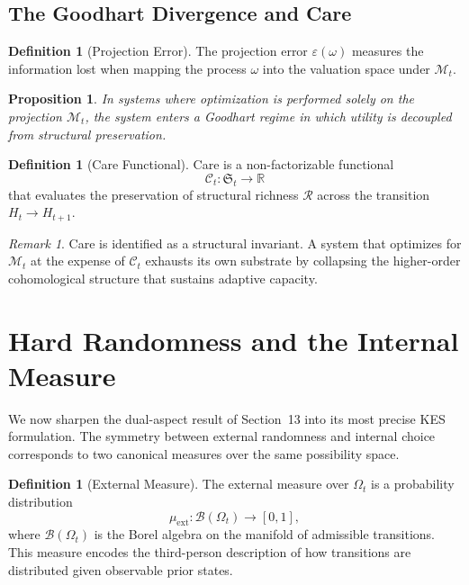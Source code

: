 \documentclass[11pt,a4paper]{article}
\newtheorem{proposition}[theorem]{Proposition}
\theoremstyle{definition}
\newtheorem{definition}[theorem]{Definition}
\theoremstyle{remark}
\newtheorem{remark}[theorem]{Remark}
\begin{document}
\subsection{The Goodhart Divergence and Care}

\begin{definition}[Projection Error]
The projection error $\varepsilon(\omega)$ measures the information lost when mapping the process $\omega$ into the valuation space under $\mathcal{M}_t$.
\end{definition}

\begin{proposition}
In systems where optimization is performed solely on the projection $\mathcal{M}_t$, the system enters a Goodhart regime in which utility is decoupled from structural preservation.
\end{proposition}

\begin{definition}[Care Functional]
Care is a non-factorizable functional
\[
\mathcal{C}_t : \mathfrak{S}_t \to \mathbb{R}
\]
that evaluates the preservation of structural richness $\mathcal{R}$ across the transition $H_t \to H_{t+1}$.
\end{definition}

\begin{remark}
Care is identified as a structural invariant. A system that optimizes for $\mathcal{M}_t$ at the expense of $\mathcal{C}_t$ exhausts its own substrate by collapsing the higher-order cohomological structure that sustains adaptive capacity.
\end{remark}

\section{Hard Randomness and the Internal Measure}

We now sharpen the dual-aspect result of Section~13 into its most precise KES formulation. The symmetry between external randomness and internal choice corresponds to two canonical measures over the same possibility space.

\begin{definition}[External Measure]
The external measure over $\Omega_t$ is a probability distribution
\[
\mu_{\mathrm{ext}} : \mathcal{B}(\Omega_t) \to [0,1],
\]
where $\mathcal{B}(\Omega_t)$ is the Borel algebra on the manifold of admissible transitions. This measure encodes the third-person description of how transitions are distributed given observable prior states.
\end{definition}
\end{document}

